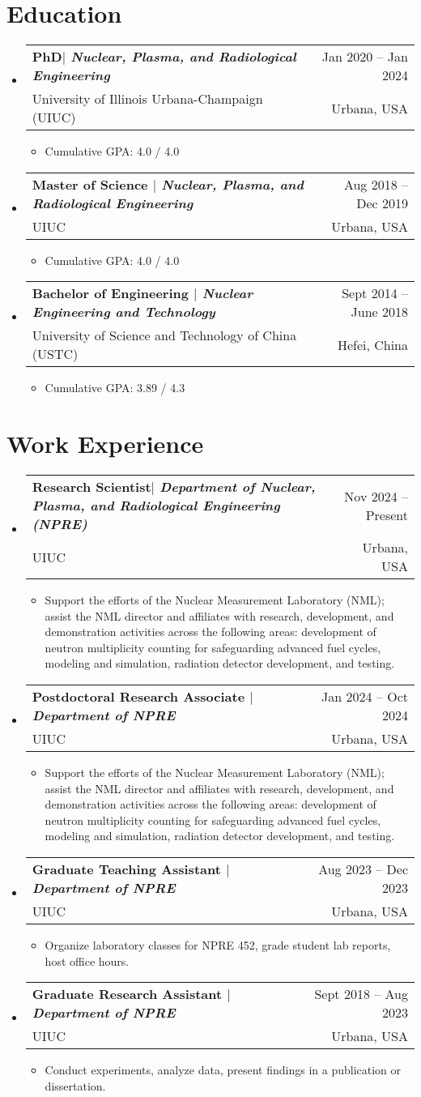 \documentclass[letterpaper,11pt]{article} %
\makeatletter
\newcommand{\CVItem}[1]{
  \item\small{
    {#1 \vspace{-2pt}}
  }
}
\newcommand{\CVSubheading}[4]{
  \vspace{-2pt}\item
    \begin{tabular*}{0.97\textwidth}[t]{l@{\extracolsep{\fill}}r}
      \textbf{#1} & \footnotesize #2 \\
      \footnotesize #3 & \footnotesize #4 \\
    \end{tabular*}\vspace{-7pt}
}
\newcommand{\CVSubHeadingListStart}{\begin{itemize}[leftmargin=0.5cm, label={}]}
\newcommand{\CVSubHeadingListEnd}{\end{itemize}}
\newcommand{\CVItemListStart}{\begin{itemize}[rightmargin=\dimexpr\linewidth-15cm-\leftmargin\relax]}
\newcommand{\CVItemListEnd}{\end{itemize}\vspace{-5pt}}
\makeatother
\begin{document}
\section{Education}
  \CVSubHeadingListStart
    \CVSubheading
      {{PhD$|$ \emph{\small{Nuclear, Plasma, and Radiological Engineering}}}}{Jan 2020 -- Jan 2024}
      {University of Illinois Urbana-Champaign (UIUC)}{Urbana, USA}
      \CVItemListStart
        \CVItem{Cumulative GPA:  4.0 / 4.0}
      \CVItemListEnd
    \CVSubheading
      {{Master of Science $|$ \emph{\small{Nuclear, Plasma, and Radiological Engineering}}}}{Aug 2018 -- Dec 2019}
      {UIUC}{Urbana, USA}
       \CVItemListStart
        \CVItem{Cumulative GPA:  4.0 / 4.0}
      \CVItemListEnd
    \CVSubheading
      {{Bachelor of Engineering $|$ \emph{\small{Nuclear Engineering and Technology}}}}{Sept 2014 -- June 2018}
      {University of Science and Technology of China (USTC)}{Hefei, China}
       \CVItemListStart
        \CVItem{Cumulative GPA:  3.89 / 4.3}
      \CVItemListEnd
  \CVSubHeadingListEnd


\section{Work Experience}
  \CVSubHeadingListStart
    \CVSubheading
      {{Research Scientist$|$ \emph{\small{Department of Nuclear, Plasma, and Radiological Engineering (NPRE)}}}}{Nov 2024 -- Present}
      {UIUC}{Urbana, USA}
      \CVItemListStart
        \CVItem{Support the efforts of the Nuclear Measurement Laboratory (NML); assist the NML director and affiliates with research, development, and demonstration activities across the following areas: development of neutron multiplicity counting for safeguarding advanced fuel cycles, modeling and simulation, radiation detector development, and testing.}
      \CVItemListEnd
    \CVSubheading
      {{Postdoctoral Research Associate $|$ \emph{\small{Department of NPRE}}}}{Jan 2024 -- Oct 2024}
      {UIUC}{Urbana, USA}
      \CVItemListStart
        \CVItem{Support the efforts of the Nuclear Measurement Laboratory (NML); assist the NML director and affiliates with research, development, and demonstration activities across the following areas: development of neutron multiplicity counting for safeguarding advanced fuel cycles, modeling and simulation, radiation detector development, and testing.}
      \CVItemListEnd
    \CVSubheading
      {{Graduate Teaching Assistant $|$ \emph{\small{Department of NPRE}}}}{Aug 2023 -- Dec 2023}
      {UIUC}{Urbana, USA}
      \CVItemListStart
        \CVItem{Organize laboratory classes for NPRE 452, grade student lab reports, host office hours.}
      \CVItemListEnd
    \CVSubheading
      {{Graduate Research Assistant $|$ \emph{\small{Department of NPRE}}}}{Sept 2018 -- Aug 2023}
      {UIUC}{Urbana, USA}
      \CVItemListStart
        \CVItem{Conduct experiments, analyze data, present findings in a publication or dissertation.}
      \CVItemListEnd
  \CVSubHeadingListEnd
\end{document}
